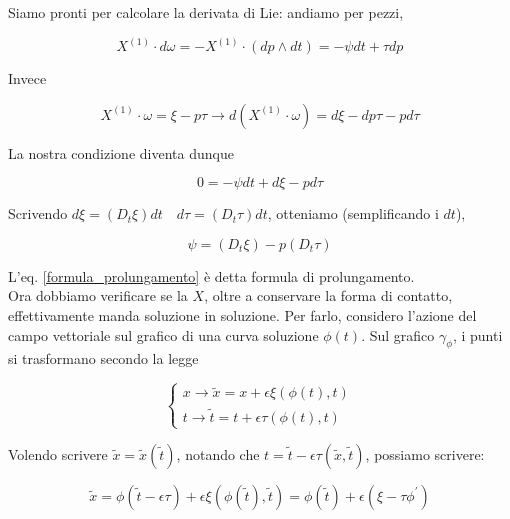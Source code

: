\documentclass{report}
\begin{document}
Siamo pronti per calcolare la derivata di Lie: andiamo per pezzi, 

\begin{equation}
    X^{(1)} \cdot d\omega = -X^{(1)} \cdot(dp \wedge dt) = -\psi dt + \tau dp  
\end{equation}

Invece 

\begin{equation}
    X^{(1)} \cdot \omega = \xi - p\tau \rightarrow d(X^{(1)} \cdot \omega) = d\xi - dp\tau - pd\tau 
\end{equation}

La nostra condizione diventa dunque 

\begin{equation}
    0 = -\psi dt + d\xi -pd\tau 
\end{equation}

Scrivendo $d\xi = (D_t\xi)dt \quad d\tau = (D_t\tau)dt$, otteniamo (semplificando i $dt$), 

\begin{tcolorbox}[colback=doc!10, colframe=black, boxrule=1pt]
\begin{equation}
    \label{formula_prolungamento}
    \psi = (D_t\xi) -p(D_t\tau)
\end{equation}
\end{tcolorbox}

L'eq. \ref{formula_prolungamento} è detta formula di prolungamento. \\

Ora dobbiamo verificare se la $X$, oltre a conservare la forma di contatto, effettivamente manda soluzione in soluzione. Per farlo, considero l'azione del campo vettoriale sul grafico di una curva soluzione $\phi(t)$. Sul grafico $\gamma_\phi$, i punti si trasformano secondo la legge 

\[\begin{cases}
    x \rightarrow \tilde{x} = x +\epsilon\xi(\phi(t), t) \\
    t \rightarrow \tilde{t} = t + \epsilon\tau(\phi(t), t)
\end{cases}\]

Volendo scrivere $\tilde{x}= \tilde{x}(\tilde{t})$, notando che $t = \tilde{t} - \epsilon\tau(\tilde{x}, \tilde{t})$, possiamo scrivere: 

\begin{equation}
    \tilde{x} = \phi(\tilde{t} - \epsilon\tau) + \epsilon\xi(\phi(\tilde{t}), \tilde{t}) = \phi(\tilde{t}) + \epsilon(\xi - \tau\phi^{'})
\end{equation}
\end{document}

